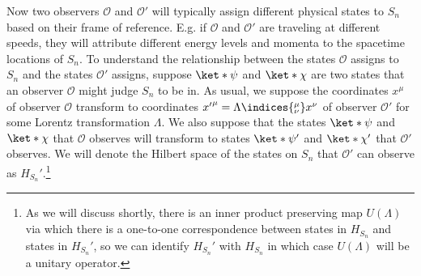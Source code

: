 \documentclass[12pt]{report}
\begin{document}
Now two observers $\mathcal{O}$ and $\mathcal{O}'$ will typically assign different physical states to $S_n$ based on their frame of reference. E.g. if $\mathcal{O}$ and $\mathcal{O}'$ are traveling at different speeds, they will attribute different energy levels and momenta to the spacetime locations of $S_n$. To understand the relationship between the states $\mathcal{O}$ assigns to $S_n$ and the states $\mathcal{O}'$ assigns, suppose $\ket*{\psi}$ and  $\ket*{\chi}$ are two states that an observer $\mathcal{O}$ might judge $S_n$ to be in. As usual, we suppose the coordinates $x^\mu$ of observer $\mathcal{O}$ transform to coordinates ${x'}^\mu=\Lambda\indices{^\mu_\nu}x^\nu$ of observer $\mathcal{O}'$ for some Lorentz transformation $\Lambda.$ We also suppose that the states $\ket*{\psi}$ and $\ket*{\chi}$ that $\mathcal{O}$ observes will transform to states $\ket*{\psi'}$  and $\ket*{\chi'}$ that $\mathcal{O}'$ observes. %
%
 We will denote the Hilbert space of the states on $S_n$ that $\mathcal{O}'$ can observe as $H_{S_n}'$.\label{Hprimespace}\footnote{As we will discuss shortly, there is an inner product preserving map $U(\Lambda)$ via which there is a one-to-one correspondence between states in $H_{S_n}$ and states in $H_{S_n}'$, so we can identify $H_{S_n}'$ with $H_{S_n}$ in which case $U(\Lambda)$ will be a unitary operator.}%
%
\end{document}
